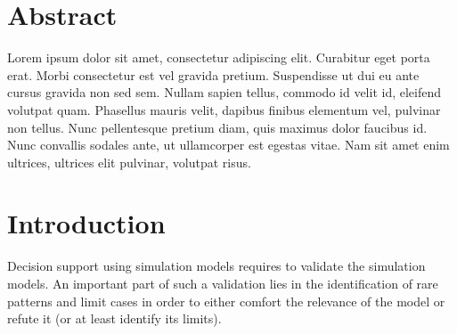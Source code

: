 \documentclass[10pt,letterpaper]{article}
\theoremstyle{definition}
\theoremstyle{remark}
\begin{document}
\section*{Abstract}
Lorem ipsum dolor sit amet, consectetur adipiscing elit. Curabitur eget porta erat. Morbi consectetur est vel gravida pretium. Suspendisse ut dui eu ante cursus gravida non sed sem. Nullam sapien tellus, commodo id velit id, eleifend volutpat quam. Phasellus mauris velit, dapibus finibus elementum vel, pulvinar non tellus. Nunc pellentesque pretium diam, quis maximus dolor faucibus id. Nunc convallis sodales ante, ut ullamcorper est egestas vitae. Nam sit amet enim ultrices, ultrices elit pulvinar, volutpat risus.



\linenumbers

\section*{Introduction}

Decision support using simulation models requires to validate the simulation models.
An important part of such a validation lies in the identification of rare patterns and limit cases in order to either comfort the relevance of the model or refute it (or at least identify its limits).
\end{document}
